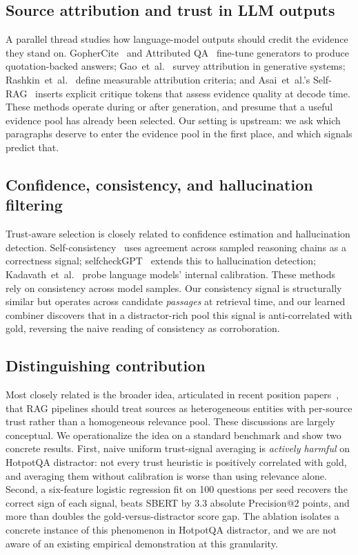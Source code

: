 \subsection{Source attribution and trust in LLM outputs}

A parallel thread studies how language-model outputs should credit the
evidence they stand on. GopherCite~\cite{menick2022gophercite} and
Attributed QA~\cite{bohnet2022attributed} fine-tune generators to
produce quotation-backed answers; Gao~et~al.~\cite{gao2023enabling}
survey attribution in generative systems; Rashkin~et~al.~\cite{rashkin2023measuring}
define measurable attribution criteria; and Asai~et~al.'s
Self-RAG~\cite{asai2024selfrag} inserts explicit critique tokens that
assess evidence quality at decode time. These methods operate during
or after generation, and presume that a useful evidence pool has
already been selected. Our setting is upstream: we ask which
paragraphs deserve to enter the evidence pool in the first place, and
which signals predict that.

\subsection{Confidence, consistency, and hallucination filtering}

Trust-aware selection is closely related to confidence estimation and
hallucination detection. Self-consistency~\cite{wang2023selfconsistency}
uses agreement across sampled reasoning chains as a correctness
signal; selfcheckGPT~\cite{manakul2023selfcheckgpt} extends this to
hallucination detection; Kadavath~et~al.~\cite{kadavath2022language}
probe language models' internal calibration. These methods rely on
consistency across model samples. Our consistency signal is structurally
similar but operates across candidate \emph{passages} at retrieval
time, and our learned combiner discovers that in a distractor-rich
pool this signal is anti-correlated with gold, reversing the naive
reading of consistency as corroboration.

\subsection{Distinguishing contribution}

Most closely related is the broader idea, articulated in recent
position papers~\cite{wu2024retrieval,ram2023incontextrag}, that RAG
pipelines should treat sources as heterogeneous entities with
per-source trust rather than a homogeneous relevance pool. These
discussions are largely conceptual. We operationalize the idea on a
standard benchmark and show two concrete results. First, naive uniform
trust-signal averaging is \emph{actively harmful} on HotpotQA
distractor: not every trust heuristic is positively correlated with
gold, and averaging them without calibration is worse than using
relevance alone. Second, a six-feature logistic regression fit on 100
questions per seed recovers the correct sign of each signal, beats
SBERT by 3.3 absolute Precision@2 points, and more than doubles the
gold-versus-distractor score gap. The ablation isolates
a concrete instance of this phenomenon in HotpotQA distractor, and
we are not aware of an existing empirical demonstration at this
granularity.
